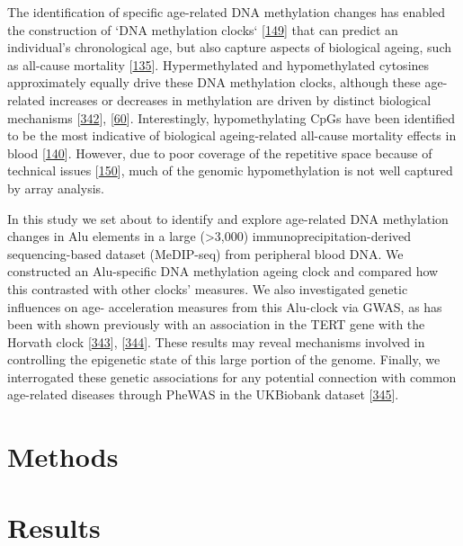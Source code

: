 \documentclass[
]{book}
\begin{document}
The identification of specific age-related DNA methylation changes has enabled the construction of `DNA methylation clocks` {[}\protect\hyperlink{ref-Horvath2018}{149}{]} that can predict an individual's chronological age, but also capture aspects of biological ageing, such as all-cause mortality {[}\protect\hyperlink{ref-Marioni2015}{135}{]}.
Hypermethylated and hypomethylated cytosines approximately equally drive these DNA methylation clocks, although these age-related increases or decreases in methylation are driven by distinct biological mechanisms {[}\protect\hyperlink{ref-Mozhui2017}{342}{]}, {[}\protect\hyperlink{ref-Wu2017}{60}{]}.
Interestingly, hypomethylating CpGs have been identified to be the most indicative of biological ageing-related all-cause mortality effects in blood {[}\protect\hyperlink{ref-Zhang2017}{140}{]}.
However, due to poor coverage of the repetitive space because of technical issues {[}\protect\hyperlink{ref-Bell2019}{150}{]}, much of the genomic hypomethylation is not well captured by array analysis.

In this study we set about to identify and explore age-related DNA methylation changes in Alu elements in a large (\textgreater3,000) immunoprecipitation-derived sequencing-based dataset (MeDIP-seq) from peripheral blood DNA. We constructed an Alu-specific DNA methylation ageing clock and compared how this contrasted with other clocks' measures. We also investigated genetic influences on age- acceleration measures from this Alu-clock via GWAS, as has been with shown previously with an association in the TERT gene with the Horvath clock {[}\protect\hyperlink{ref-Lu2017}{343}{]}, {[}\protect\hyperlink{ref-Gibson2019}{344}{]}.
These results may reveal mechanisms involved in controlling the epigenetic state of this large portion of the genome.
Finally, we interrogated these genetic associations for any potential connection with common age-related diseases through PheWAS in the UKBiobank dataset {[}\protect\hyperlink{ref-Bycroft2017}{345}{]}.

\hypertarget{methods-2}{%
\section{Methods}\label{methods-2}}

\hypertarget{results-1}{%
\section{Results}\label{results-1}}
\end{document}
